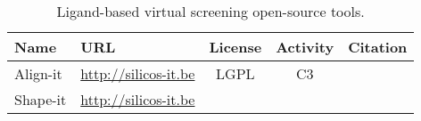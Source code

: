 \begin{table} 
    \begin{tabular}{ l l c c c  }
    Name & URL & License & Activity & Citation \\ \hline
Align-it & \url{http://silicos-it.be} & LGPL & C3 & \\
Shape-it & \url{http://silicos-it.be} & & & \\
    \end{tabular} 
    \caption{\label{qsartable} Ligand-based virtual screening open-source tools.}
\end{table}
